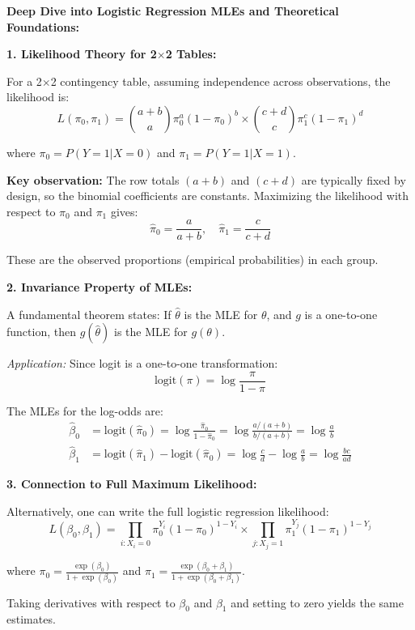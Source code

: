 \documentclass[12pt]{article}
\begin{document}
\begin{explanation}
\textbf{Deep Dive into Logistic Regression MLEs and Theoretical Foundations:}

\textbf{1. Likelihood Theory for 2$\times$2 Tables:}

For a 2$\times$2 contingency table, assuming independence across observations, the likelihood is:
\[
L(\pi_0, \pi_1) = \binom{a+b}{a} \pi_0^a (1-\pi_0)^b \times \binom{c+d}{c} \pi_1^c (1-\pi_1)^d
\]

where $\pi_0 = P(Y=1|X=0)$ and $\pi_1 = P(Y=1|X=1)$.

\textbf{Key observation:} The row totals $(a+b)$ and $(c+d)$ are typically fixed by design, so the binomial coefficients are constants. Maximizing the likelihood with respect to $\pi_0$ and $\pi_1$ gives:
\[
\hat{\pi}_0 = \frac{a}{a+b}, \quad \hat{\pi}_1 = \frac{c}{c+d}
\]

These are the observed proportions (empirical probabilities) in each group.

\textbf{2. Invariance Property of MLEs:}

A fundamental theorem states: If $\hat{\theta}$ is the MLE for $\theta$, and $g$ is a one-to-one function, then $g(\hat{\theta})$ is the MLE for $g(\theta)$.

\textit{Application:} Since logit is a one-to-one transformation:
\[
\text{logit}(\pi) = \log\frac{\pi}{1-\pi}
\]

The MLEs for the log-odds are:
\begin{align*}
\hat{\beta}_0 &= \text{logit}(\hat{\pi}_0) = \log\frac{\hat{\pi}_0}{1-\hat{\pi}_0} = \log\frac{a/(a+b)}{b/(a+b)} = \log\frac{a}{b} \\
\hat{\beta}_1 &= \text{logit}(\hat{\pi}_1) - \text{logit}(\hat{\pi}_0) = \log\frac{c}{d} - \log\frac{a}{b} = \log\frac{bc}{ad}
\end{align*}

\textbf{3. Connection to Full Maximum Likelihood:}

Alternatively, one can write the full logistic regression likelihood:
\[
L(\beta_0, \beta_1) = \prod_{i: X_i=0} \pi_0^{Y_i}(1-\pi_0)^{1-Y_i} \times \prod_{j: X_j=1} \pi_1^{Y_j}(1-\pi_1)^{1-Y_j}
\]

where $\pi_0 = \frac{\exp(\beta_0)}{1+\exp(\beta_0)}$ and $\pi_1 = \frac{\exp(\beta_0 + \beta_1)}{1+\exp(\beta_0 + \beta_1)}$.

Taking derivatives with respect to $\beta_0$ and $\beta_1$ and setting to zero yields the same estimates.


\end{explanation}
\end{document}
